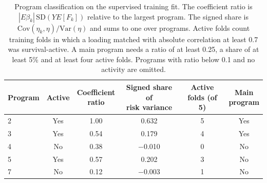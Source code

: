 \begin{table}[!htb]
\centering
\small
\begin{tabular}{lccccc}
\toprule
Program & Active & \shortstack{Coefficient\\ratio} & \shortstack{Signed share of\\risk variance} & \shortstack{Active\\folds (of 5)} & \shortstack{Main\\program} \\
\midrule
2 & Yes & 1.00 & 0.632 & 5 & Yes \\
3 & Yes & 0.54 & 0.179 & 4 & Yes \\
4 & No & 0.38 & $-$0.010 & 0 & No \\
5 & Yes & 0.57 & 0.202 & 3 & No \\
7 & No & 0.12 & $-$0.003 & 1 & No \\
\bottomrule
\end{tabular}
\caption{Program classification on the supervised training fit. The coefficient ratio is $|E\beta_k|\,\mathrm{SD}(YE[F_k])$ relative to the largest program. The signed share is $\mathrm{Cov}(\eta_k,\eta)/\mathrm{Var}(\eta)$ and sums to one over programs. Active folds count training folds in which a loading matched with absolute correlation at least 0.7 was survival-active. A main program needs a ratio of at least 0.25, a share of at least 5\% and at least four active folds. Programs with ratio below 0.1 and no activity are omitted.}
\label{tab:program-rule}
\end{table}
